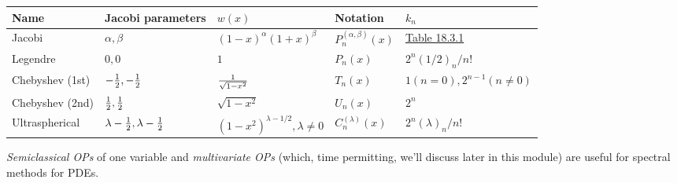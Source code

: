 \documentclass[12pt,a4paper]{article}
\begin{document}
\begin{tabular}
{l | l | l | l | l}
Name & Jacobi parameters & $w(x)$ & Notation & $k_n$ \\
\hline
Jacobi & $\alpha,\beta$ & $(1-x)^{\alpha} (1+x)^\beta$ & $P_n^{(\alpha,\beta)}(x)$ & \href{http://dlmf.nist.gov/18.3}{Table 18.3.1} \\
Legendre & $0,0$ & $1$ & $P_n(x)$ & $2^n(1/2)_n/n!$ \\
Chebyshev (1st) & $-{1 \over 2},-{1 \over 2}$ & $1 \over \sqrt{1-x^2}$ & $T_n(x)$ & $1 (n=0), 2^{n-1} (n \neq 0)$ \\
Chebyshev (2nd) & ${1 \over 2},{1 \over 2}$ & $\sqrt{1-x^2}$ & $U_n(x)$ & $2^n$ \\
Ultraspherical & $\lambda-{1 \over 2},\lambda-{1 \over 2}$ & $(1-x^2)^{\lambda - 1/2}, \lambda \neq 0$ & $C_n^{(\lambda)}(x)$ & $2^n(\lambda)_n/n!$ \\
\end{tabular}
\emph{Semiclassical OPs} of one variable and \emph{multivariate OPs} (which, time permitting, we'll discuss later in this module) are useful for spectral methods for PDEs.
\end{document}
